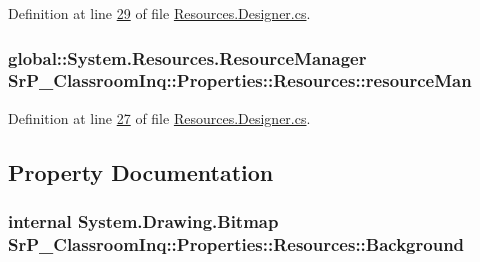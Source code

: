 \-Definition at line \hyperlink{_resources_8_designer_8cs_source_l00029}{29} of file \hyperlink{_resources_8_designer_8cs_source}{\-Resources.\-Designer.\-cs}.

\hypertarget{class_sr_p___classroom_inq_1_1_properties_1_1_resources_ae22dad3e6078a39a90778bb00e89e1c6}{
\subsubsection[{resource\-Man}]{\setlength{\rightskip}{0pt plus 5cm}global\-::\-System.\-Resources.\-Resource\-Manager {\bf \-Sr\-P\-\_\-\-Classroom\-Inq\-::\-Properties\-::\-Resources\-::resource\-Man}}}
\label{class_sr_p___classroom_inq_1_1_properties_1_1_resources_ae22dad3e6078a39a90778bb00e89e1c6}


\-Definition at line \hyperlink{_resources_8_designer_8cs_source_l00027}{27} of file \hyperlink{_resources_8_designer_8cs_source}{\-Resources.\-Designer.\-cs}.



\subsection{\-Property \-Documentation}
\hypertarget{class_sr_p___classroom_inq_1_1_properties_1_1_resources_a16ac92929f55281abad59488efae062b}{
\subsubsection[{\-Background}]{\setlength{\rightskip}{0pt plus 5cm}internal \-System.\-Drawing.\-Bitmap \-Sr\-P\-\_\-\-Classroom\-Inq\-::\-Properties\-::\-Resources\-::\-Background}}
\label{class_sr_p___classroom_inq_1_1_properties_1_1_resources_a16ac92929f55281abad59488efae062b}



